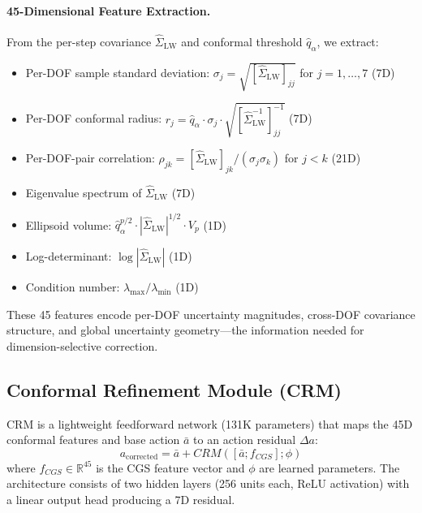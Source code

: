\documentclass[10pt,letterpaper]{article}
\newcommand{\crm}{CRM}
\newcommand{\cgs}{CGS}
\begin{document}
\paragraph{45-Dimensional Feature Extraction.}
From the per-step covariance $\hat{\Sigma}_{\text{LW}}$ and conformal threshold $\hat{q}_\alpha$, we extract:
\begin{itemize}
    \item Per-DOF sample standard deviation: $\sigma_j = \sqrt{[\hat{\Sigma}_{\text{LW}}]_{jj}}$ for $j=1,\ldots,7$ \hfill (7D)
    \item Per-DOF conformal radius: $r_j = \hat{q}_\alpha \cdot \sigma_j \cdot \sqrt{[\hat{\Sigma}_{\text{LW}}^{-1}]_{jj}^{-1}}$ \hfill (7D)
    \item Per-DOF-pair correlation: $\rho_{jk} = [\hat{\Sigma}_{\text{LW}}]_{jk}/(\sigma_j\sigma_k)$ for $j<k$ \hfill (21D)
    \item Eigenvalue spectrum of $\hat{\Sigma}_{\text{LW}}$ \hfill (7D)
    \item Ellipsoid volume: $\hat{q}_\alpha^{p/2} \cdot |\hat{\Sigma}_{\text{LW}}|^{1/2} \cdot V_p$ \hfill (1D)
    \item Log-determinant: $\log|\hat{\Sigma}_{\text{LW}}|$ \hfill (1D)
    \item Condition number: $\lambda_{\max}/\lambda_{\min}$ \hfill (1D)
\end{itemize}
These 45 features encode per-DOF uncertainty magnitudes, cross-DOF covariance structure, and global uncertainty geometry---the information needed for dimension-selective correction.

\subsection{Conformal Refinement Module (CRM)}
\label{sec:crm}

\crm{} is a lightweight feedforward network (131K parameters) that maps the 45D conformal features and base action $\bar{a}$ to an action residual $\Delta a$:
\begin{equation}
    a_{\text{corrected}} = \bar{a} + \crm{}([\bar{a}; f_{\cgs{}}]; \phi)
\end{equation}
where $f_{\cgs{}} \in \mathbb{R}^{45}$ is the \cgs{} feature vector and $\phi$ are learned parameters.
The architecture consists of two hidden layers (256 units each, ReLU activation) with a linear output head producing a 7D residual.
\end{document}
